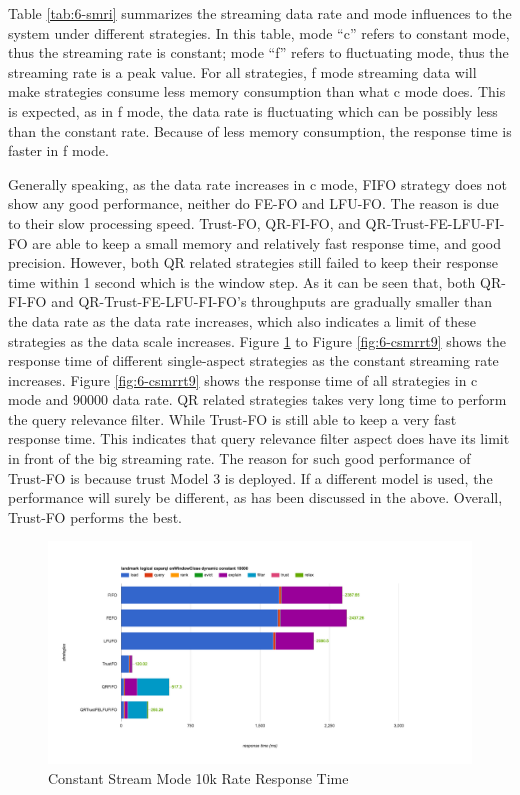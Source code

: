 Table \ref{tab:6-smri} summarizes the streaming data rate and mode influences to the system under different strategies. 
In this table, mode ``c'' refers to constant mode, thus the streaming rate is constant;
mode ``f'' refers to fluctuating mode, thus the streaming rate is a peak value. 
For all strategies, f mode streaming data will make strategies consume less memory consumption than what c mode does. 
This is expected, as in f mode, the data rate is fluctuating which can be possibly less than the constant rate. 
Because of less memory consumption, the response time is faster in f mode. 

Generally speaking, as the data rate increases in c mode, FIFO strategy does not show any good performance, neither do FE-FO and LFU-FO.
The reason is due to their slow processing speed. 
Trust-FO, QR-FI-FO, and QR-Trust-FE-LFU-FI-FO are able to keep a small memory and relatively fast response time, and good precision. 
However, both QR related strategies still failed to keep their response time within 1 second which is the window step. 
As it can be seen that, both QR-FI-FO and QR-Trust-FE-LFU-FI-FO's throughputs are gradually smaller than the data rate as the data rate increases, which also indicates a limit of these strategies as the data scale increases. 
Figure \ref{fig:6-csmrrt1} to Figure \ref{fig:6-csmrrt9} shows the response time of different single-aspect strategies as the constant streaming rate increases. 
Figure \ref{fig:6-csmrrt9} shows the response time of all strategies in c mode and 90000 data rate. 
QR related strategies takes very long time to perform the query relevance filter. 
While Trust-FO is still able to keep a very fast response time. 
This indicates that query relevance filter aspect does have its limit in front of the big streaming rate. 
The reason for such good performance of Trust-FO is because trust Model 3 is deployed. 
If a different model is used, the performance will surely be different, as has been discussed in the above. 
Overall, Trust-FO performs the best. 

\begin{figure}[!htbp]
	\centering
    \includegraphics[width=6.5in]{img/6-1wt.png}
    \caption{Constant Stream Mode 10k Rate Response Time}
    \label{fig:6-csmrrt1}
\end{figure}

